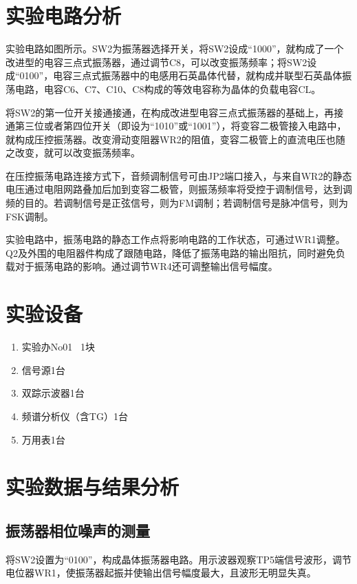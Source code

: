 \documentclass{../source/Experiment}
\begin{document}
    \section{实验电路分析}

    实验电路如图所示。SW2为振荡器选择开关，将SW2设成“1000”，就构成了一个改进型的电容三点式振荡器，通过调节C8，可以改变振荡频率；将SW2设成“0100”，电容三点式振荡器中的电感用石英晶体代替，就构成并联型石英晶体振荡电路，电容C6、C7、C10、C8构成的等效电容称为晶体的负载电容CL。

    将SW2的第一位开关接通接通，在构成改进型电容三点式振荡器的基础上，再接通第三位或者第四位开关（即设为“1010”或“1001”），将变容二极管接入电路中，就构成压控振荡器。改变滑动变阻器WR2的阻值，变容二极管上的直流电压也随之改变，就可以改变振荡频率。

    在压控振荡电路连接方式下，音频调制信号可由JP2端口接入，与来自WR2的静态电压通过电阻网路叠加后加到变容二极管，则振荡频率将受控于调制信号，达到调频的目的。若调制信号是正弦信号，则为FM调制；若调制信号是脉冲信号，则为FSK调制。

    实验电路中，振荡电路的静态工作点将影响电路的工作状态，可通过WR1调整。Q2及外围的电阻器件构成了跟随电路，降低了振荡电路的输出阻抗，同时避免负载对于振荡电路的影响。通过调节WR4还可调整输出信号幅度。


    \section{实验设备}
        \begin{enumerate}
            \item 实验办No01 \, 1块
            \item 信号源1台
            \item 双踪示波器1台
            \item 频谱分析仪（含TG）1台
            \item 万用表1台
        \end{enumerate}
        
    \section{实验数据与结果分析}
        \subsection{振荡器相位噪声的测量}

        将SW2设置为“0100”，构成晶体振荡器电路。用示波器观察TP5端信号波形，调节电位器WR1，使振荡器起振并使输出信号幅度最大，且波形无明显失真。
\end{document}
